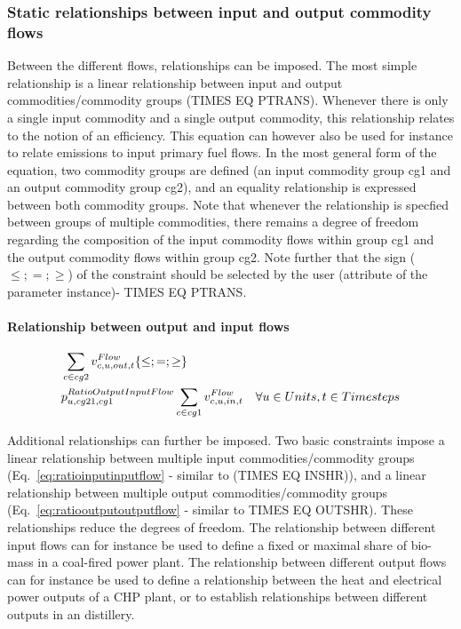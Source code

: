 \documentclass[10pt,english]{article}
\begin{document}
\subsubsection{Static relationships between input and output commodity flows}
Between the different flows, relationships can be imposed. The most simple relationship is a linear relationship between input and output commodities/commodity groups (TIMES EQ PTRANS). Whenever there is only a single input commodity and a single output commodity, this relationship relates to the notion of an efficiency. This equation can however also be used for instance to relate emissions to input primary fuel flows. In the most general form of the equation, two commodity groups are defined (an input commodity group cg1 and an output commodity group cg2), and an equality relationship is expressed between both commodity groups. Note that whenever the relationship is specfied between groups of multiple commodities, there remains a degree of freedom regarding the composition of the input commodity flows within group cg1 and the output commodity flows within group cg2. Note further that the sign ($\le;=;\ge$) of the constraint should be selected by the user (attribute of the parameter instance)- TIMES EQ PTRANS. 

\paragraph{Relationship between output and input flows}
\begin{align} \label{eq:ratiooutputinputflow}
&\sum_{\commodity \in cg2} \vFlow[\commodity,\unit,out,\timestep] \{\le;=;\ge\} \nonumber \\
&\pRatioOutputInputFlow \sum_{\commodity \in cg1} \vFlow[\commodity,\unit,in,\timestep] \quad \forall \units, \timesteps
\end{align}

Additional relationships can further be imposed. Two basic constraints impose a linear relationship between multiple input commodities/commodity groups (Eq.~\eqref{eq:ratioinputinputflow} - similar to (TIMES EQ INSHR)), and a linear relationship between multiple output commodities/commodity groups (Eq.~\eqref{eq:ratiooutputoutputflow} - similar to TIMES EQ OUTSHR). These relationships reduce the degrees of freedom. The relationship between different input flows can for instance be used to define a fixed or maximal share of bio-mass in a coal-fired power plant. The relationship between different output flows can for instance be used to define a relationship between the heat and electrical power outputs of a CHP plant, or to establish relationships between different outputs in an distillery. 
\end{document}
